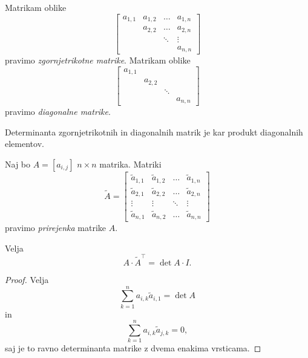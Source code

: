 \documentclass[12pt, a4paper]{article}
\begin{document}
\begin{definicija}
Matrikam oblike
\[
\begin{bmatrix}
a_{1,1} & a_{1,2} & \dots  & a_{1,n} \\ 
        & a_{2,2} & \dots  & a_{2,n} \\ 
        &         & \ddots & \vdots  \\ 
        &         &        & a_{n,n}
\end{bmatrix} 
\]
pravimo \emph{zgornjetrikotne matrike}. Matrikam oblike 
\[
\begin{bmatrix}
a_{1,1} &         &        &        \\ 
        & a_{2,2} &        &        \\ 
        &         & \ddots &        \\ 
        &         &        & a_{n,n}
\end{bmatrix} 
\]
pravimo \emph{diagonalne matrike}.
\end{definicija}

\begin{posledica}
Determinanta zgornjetrikotnih in diagonalnih matrik je kar produkt diagonalnih elementov.
\end{posledica}

\obvs

\begin{definicija}
Naj bo $A=\left[a_{i,j}\right]$ $n\times n$ matrika. Matriki
\[
\widetilde{A}=\begin{bmatrix}
\widetilde{a}_{1,1} & \widetilde{a}_{1,2} & \dots  & \widetilde{a}_{1,n} \\ 
\widetilde{a}_{2,1} & \widetilde{a}_{2,2} & \dots  & \widetilde{a}_{2,n} \\ 
\vdots              & \vdots              & \ddots & \vdots              \\ 
\widetilde{a}_{n,1} & \widetilde{a}_{n,2} & \dots  & \widetilde{a}_{n,n}
\end{bmatrix} 
\]
pravimo \emph{prirejenka} matrike $A$.
\end{definicija}

\begin{trditev}
Velja
\[
A\cdot\widetilde{A}^\top = \det A\cdot I.
\]
\end{trditev}

\begin{proof}
Velja
\[
\sum_{k=1}^n a_{i,k}\widetilde{a}_{i,1} = \det A
\]
in
\[
\sum_{k=1}^n a_{i,k}\widetilde{a}_{j,k}=0,
\]
saj je to ravno determinanta matrike z dvema enakima vrsticama.
\end{proof}
\end{document}
